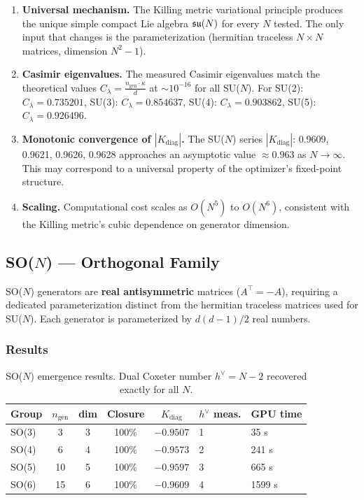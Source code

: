 \begin{enumerate}[label=\arabic*.]
\item \textbf{Universal mechanism.} The Killing metric variational principle produces the unique simple compact Lie algebra $\mathfrak{su}(N)$ for every $N$ tested. The only input that changes is the parameterization (hermitian traceless $N \times N$ matrices, dimension $N^2 - 1$).

\item \textbf{Casimir eigenvalues.} The measured Casimir eigenvalues match the theoretical values $C_\lambda = \frac{n_{\mathrm{gen}} \cdot \kappa}{d}$ at $\sim 10^{-16}$ for all SU($N$). For SU(2): $C_\lambda = 0.735201$, SU(3): $C_\lambda = 0.854637$, SU(4): $C_\lambda = 0.903862$, SU(5): $C_\lambda = 0.926496$.

\item \textbf{Monotonic convergence of $|K_{\mathrm{diag}}|$.} The SU($N$) series $|K_{\mathrm{diag}}|$: 0.9609, 0.9621, 0.9626, 0.9628 approaches an asymptotic value $\approx 0.963$ as $N \to \infty$. This may correspond to a universal property of the optimizer's fixed-point structure.

\item \textbf{Scaling.} Computational cost scales as $O(N^5)$ to $O(N^6)$, consistent with the Killing metric's cubic dependence on generator dimension.
\end{enumerate}

\subsection{SO($N$) --- Orthogonal Family}\label{sec:so_n}

SO($N$) generators are \textbf{real antisymmetric} matrices ($A^\top = -A$), requiring a dedicated parameterization distinct from the hermitian traceless matrices used for SU($N$). Each generator is parameterized by $d(d-1)/2$ real numbers.

\subsubsection{Results}

\begin{table}[H]
\centering
\begin{tabular}{lccccll}
\hline\hline
\textbf{Group} & \textbf{$n_{\mathrm{gen}}$} & \textbf{dim} & \textbf{Closure} & \textbf{$K_{\mathrm{diag}}$} & \textbf{$h^\vee$ meas.} & \textbf{GPU time} \\
\hline
SO(3) & 3 & 3 & 100\% & $-0.9507$ & 1 & 35 s \\
SO(4) & 6 & 4 & 100\% & $-0.9573$ & 2 & 241 s \\
SO(5) & 10 & 5 & 100\% & $-0.9597$ & 3 & 665 s \\
SO(6) & 15 & 6 & 100\% & $-0.9609$ & 4 & 1599 s \\
\hline\hline
\end{tabular}
\caption{SO($N$) emergence results. Dual Coxeter number $h^\vee = N-2$ recovered exactly for all $N$.}
\label{tab:so_n_results}
\end{table}

